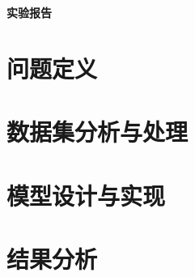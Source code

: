 \documentclass[11pt]{article}
\begin{document}
\begin{center}
    \bf{实验报告 }
\end{center}

\vspace{-5mm}
\section{问题定义}\label{Theory}
\vspace{-2mm}

\section{数据集分析与处理}

\section{模型设计与实现}

\section{结果分析}
\end{document}
